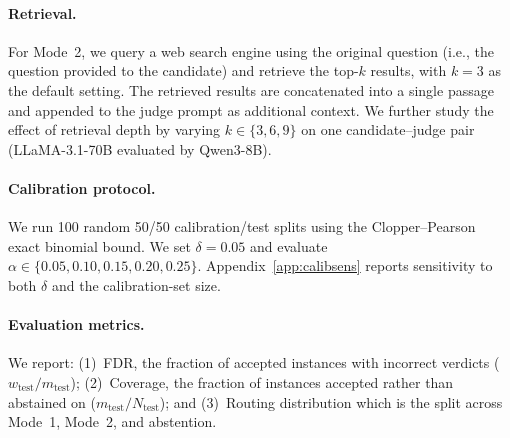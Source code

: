 \paragraph{Retrieval.}
For Mode~2, we query a web search engine using the original question (i.e., the question provided to the candidate) and retrieve the top-$k$ results, with $k=3$ as the default setting. The retrieved results are concatenated into a single passage and appended to the judge prompt as additional context. We further study the effect of retrieval depth by varying $k \in \{3,6,9\}$ on one candidate--judge pair (LLaMA-3.1-70B evaluated by Qwen3-8B).

\paragraph{Calibration protocol.}
We run 100 random 50/50 calibration/test splits using the Clopper--Pearson exact binomial bound. We set $\delta\!=\!0.05$ and evaluate $\alpha \in \{0.05, 0.10, 0.15, 0.20, 0.25\}$. Appendix~\ref{app:calibsens} reports sensitivity to both $\delta$ and the calibration-set size.

\paragraph{Evaluation metrics.}
We report: (1)~FDR, the fraction of accepted instances with incorrect verdicts ($w_\text{test}/m_\text{test}$); (2)~Coverage, the fraction of instances accepted rather than abstained on ($m_\text{test}/N_\text{test}$); and (3)~Routing distribution which is the split across Mode~1, Mode~2, and abstention.

